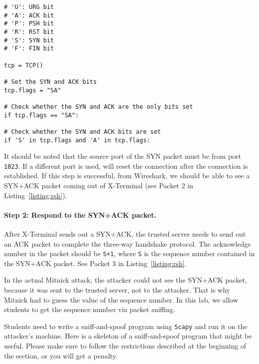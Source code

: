 \begin{lstlisting}
# 'U': URG bit
# 'A': ACK bit
# 'P': PSH bit
# 'R': RST bit
# 'S': SYN bit
# 'F': FIN bit

tcp = TCP()

# Set the SYN and ACK bits
tcp.flags = "SA"

# Check whether the SYN and ACK are the only bits set
if tcp.flags == "SA": 

# Check whether the SYN and ACK bits are set
if 'S' in tcp.flags and 'A' in tcp.flags: 
\end{lstlisting}

It should be noted that the source port of the SYN packet 
must be from port \texttt{1023}. If a different port 
is used, \rsh will reset the connection 
after the connection is established.  If this step is successful, 
from Wireshark, we should be
able to see a SYN+ACK packet coming out of 
X-Terminal (see Packet 2 in Listing~\ref{listing:rsh}).


\paragraph{Step 2: Respond to the SYN+ACK packet.}
After X-Terminal sends out a SYN+ACK, the trusted server needs 
to send out an ACK packet to complete the three-way handshake protocol. 
The acknowledge number in the packet should be \texttt{S+1}, where 
\texttt{S} is the sequence number contained in the SYN+ACK packet. 
See Packet 3 in Listing~\ref{listing:rsh}.

In the actual Mitnick attack, the attacker could not see the SYN+ACK packet, because
it was sent to the trusted server, not to the attacker. 
That is why Mitnick had to guess the value of the sequence number.
In this lab, we allow students to get 
the sequence number via packet sniffing. 

Students need to write a sniff-and-spoof program using \texttt{Scapy} and run it
on the attacker's machine. Here is a skeleton of a sniff-and-spoof program that might be
useful. Please make sure to follow the restrictions described at the
beginning of the section, or you will get a penalty. 



